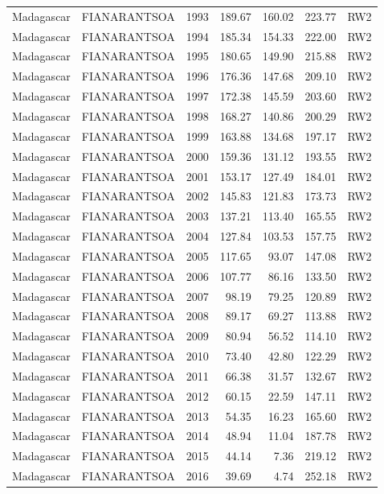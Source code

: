 \begin{longtable}{lllrrrl}
  Madagascar & FIANARANTSOA & 1993 & 189.67 & 160.02 & 223.77 & RW2 \\ 
  Madagascar & FIANARANTSOA & 1994 & 185.34 & 154.33 & 222.00 & RW2 \\ 
  Madagascar & FIANARANTSOA & 1995 & 180.65 & 149.90 & 215.88 & RW2 \\ 
  Madagascar & FIANARANTSOA & 1996 & 176.36 & 147.68 & 209.10 & RW2 \\ 
  Madagascar & FIANARANTSOA & 1997 & 172.38 & 145.59 & 203.60 & RW2 \\ 
  Madagascar & FIANARANTSOA & 1998 & 168.27 & 140.86 & 200.29 & RW2 \\ 
  Madagascar & FIANARANTSOA & 1999 & 163.88 & 134.68 & 197.17 & RW2 \\ 
  Madagascar & FIANARANTSOA & 2000 & 159.36 & 131.12 & 193.55 & RW2 \\ 
  Madagascar & FIANARANTSOA & 2001 & 153.17 & 127.49 & 184.01 & RW2 \\ 
  Madagascar & FIANARANTSOA & 2002 & 145.83 & 121.83 & 173.73 & RW2 \\ 
  Madagascar & FIANARANTSOA & 2003 & 137.21 & 113.40 & 165.55 & RW2 \\ 
  Madagascar & FIANARANTSOA & 2004 & 127.84 & 103.53 & 157.75 & RW2 \\ 
  Madagascar & FIANARANTSOA & 2005 & 117.65 & 93.07 & 147.08 & RW2 \\ 
  Madagascar & FIANARANTSOA & 2006 & 107.77 & 86.16 & 133.50 & RW2 \\ 
  Madagascar & FIANARANTSOA & 2007 & 98.19 & 79.25 & 120.89 & RW2 \\ 
  Madagascar & FIANARANTSOA & 2008 & 89.17 & 69.27 & 113.88 & RW2 \\ 
  Madagascar & FIANARANTSOA & 2009 & 80.94 & 56.52 & 114.10 & RW2 \\ 
  Madagascar & FIANARANTSOA & 2010 & 73.40 & 42.80 & 122.29 & RW2 \\ 
  Madagascar & FIANARANTSOA & 2011 & 66.38 & 31.57 & 132.67 & RW2 \\ 
  Madagascar & FIANARANTSOA & 2012 & 60.15 & 22.59 & 147.11 & RW2 \\ 
  Madagascar & FIANARANTSOA & 2013 & 54.35 & 16.23 & 165.60 & RW2 \\ 
  Madagascar & FIANARANTSOA & 2014 & 48.94 & 11.04 & 187.78 & RW2 \\ 
  Madagascar & FIANARANTSOA & 2015 & 44.14 & 7.36 & 219.12 & RW2 \\ 
  Madagascar & FIANARANTSOA & 2016 & 39.69 & 4.74 & 252.18 & RW2 \\ 

\end{longtable}

